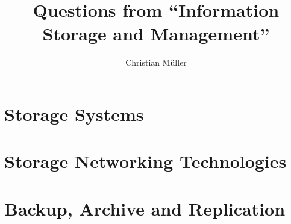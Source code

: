 \documentclass{article}
\begin{document}
\title{Questions from ``Information Storage and Management''}
\author{Christian Müller}

\pagestyle{empty}
\maketitle
\tableofcontents

\pagestyle{headings}
\newpage
\part{Storage Systems} %
\label{prt:storage_ _systems_}
	
	\newpage
	
	\newpage
	
	\newpage
	

\part{Storage Networking Technologies} %
\label{prt:storage_ _networking_ _technologies_}
	
	\newpage
	
	\newpage
	
	\newpage
	

\part{Backup, Archive and Replication} %
\label{prt:backup_archive_and_replication}
	
	\newpage
	
	\newpage
	
	\newpage
	
\end{document}
